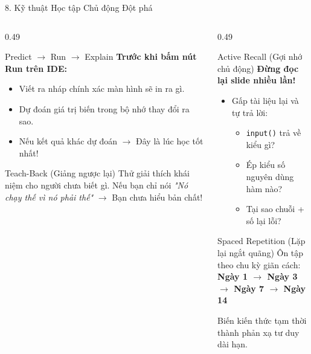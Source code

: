 \documentclass[aspectratio=169, 10pt]{beamer}
\begin{document}
\begin{frame}{8. Kỹ thuật Học tập Chủ động Đột phá}
  \begin{columns}[T]
    \begin{column}{0.49\textwidth}
      \begin{cbox}[primaryblue]{Predict $\rightarrow$ Run $\rightarrow$ Explain}
        \footnotesize
        \textbf{Trước khi bấm nút Run trên IDE:}
        \begin{itemize}\setlength{\itemsep}{1.5pt}
          \item Viết ra nháp chính xác màn hình sẽ in ra gì.
          \item Dự đoán giá trị biến trong bộ nhớ thay đổi ra sao.
          \item Nếu kết quả khác dự đoán $\rightarrow$ Đây là lúc học tốt nhất!
        \end{itemize}
      \end{cbox}
      \vspace{0.06cm}
      \begin{cbox}[secondarygreen]{Teach-Back (Giảng ngược lại)}
        \footnotesize
        Thử giải thích khái niệm cho người chưa biết gì. Nếu bạn chỉ nói \textit{"Nó chạy thế vì nó phải thế"} $\rightarrow$ Bạn chưa hiểu bản chất!
      \end{cbox}
    \end{column}
    \begin{column}{0.49\textwidth}
      \begin{cbox}[accentorange]{Active Recall (Gợi nhớ chủ động)}
        \footnotesize
        \textbf{Đừng đọc lại slide nhiều lần!}
        \begin{itemize}\setlength{\itemsep}{1.5pt}
          \item Gấp tài liệu lại và tự trả lời:
          \begin{itemize}\scriptsize
            \item \texttt{input()} trả về kiểu gì?
            \item Ép kiểu số nguyên dùng hàm nào?
            \item Tại sao chuỗi + số lại lỗi?
          \end{itemize}
        \end{itemize}
      \end{cbox}
      \vspace{0.06cm}
      \begin{cbox}[darkgray]{Spaced Repetition (Lặp lại ngắt quãng)}
        \footnotesize
        Ôn tập theo chu kỳ giãn cách:\\
        \centering\textbf{Ngày 1 $\rightarrow$ Ngày 3 $\rightarrow$ Ngày 7 $\rightarrow$ Ngày 14}\\
        \raggedright Biến kiến thức tạm thời thành phản xạ tư duy dài hạn.
      \end{cbox}
    \end{column}
  \end{columns}
\end{frame}
\end{document}
